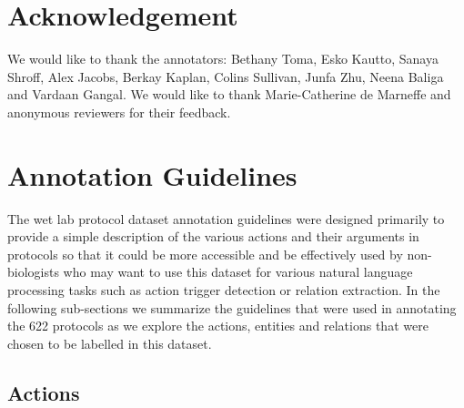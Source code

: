 \documentclass[11pt,a4paper]{article}
\begin{document}
\section*{Acknowledgement}
We would like to thank the annotators: Bethany Toma, Esko Kautto, Sanaya Shroff, Alex Jacobs, Berkay Kaplan, Colins Sullivan, Junfa Zhu, Neena Baliga and Vardaan Gangal. We would like to thank Marie-Catherine de Marneffe and anonymous reviewers for their feedback.  






\clearpage
\appendix
\section{Annotation Guidelines}
The wet lab protocol dataset annotation guidelines were designed primarily to provide a simple description of the various actions and their arguments in protocols so that it could be more accessible and be effectively used by non-biologists who may want to use this dataset for various natural language processing tasks such as action trigger detection or relation extraction. In the following sub-sections we summarize the guidelines that were used in annotating the 622 protocols as we explore the actions, entities and relations that were chosen to be labelled in this dataset. 

\begin{comment}
\section{WLP Dataset Curation}
The dataset was curated using openly accessible repositories of protocols on platforms such as \url{https://www.protocols.io} and \url{http://www.openwetware.org/}. The protocols cover a large spectrum of experimental biology, including neurology, epigenetics, metabolomics, cancer/stem cell biology, etc., as seen in Table \ref{tab:p_types_stats}. 
\end{comment}


\subsection{Actions}
\end{document}
